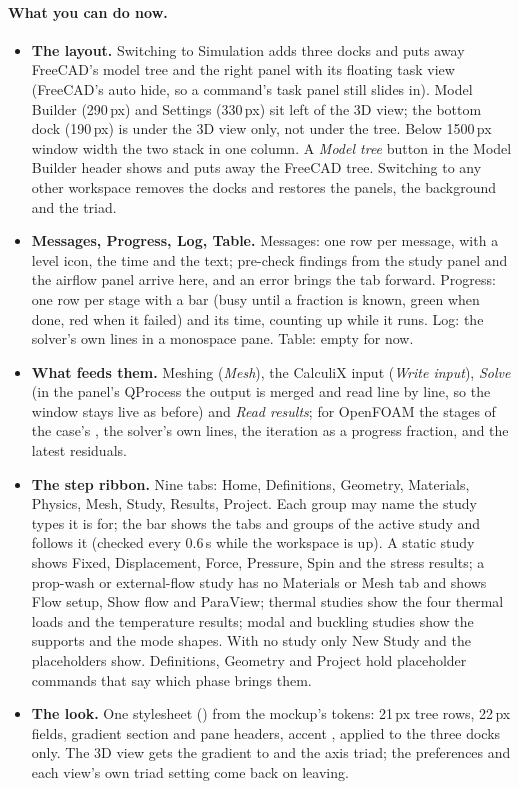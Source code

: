 \paragraph{What you can do now.}
\begin{itemize}[nosep]
  \item \textbf{The layout.} Switching to Simulation adds three docks and puts away FreeCAD's model tree and the right
        panel with its floating task view (FreeCAD's auto hide, so a command's task panel still slides in). Model
        Builder (290\,px) and Settings (330\,px) sit left of the 3D view; the bottom dock (190\,px) is under the 3D
        view only, not under the tree. Below 1500\,px window width the two stack in one column. A \emph{Model tree}
        button in the Model Builder header shows and puts away the FreeCAD tree. Switching to any other workspace
        removes the docks and restores the panels, the background and the triad.
  \item \textbf{Messages, Progress, Log, Table.} Messages: one row per message, with a level icon, the time and the
        text; pre-check findings from the study panel and the airflow panel arrive here, and an error brings the
        tab forward. Progress: one row per stage with a bar (busy until a fraction is known, green when done, red
        when it failed) and its time, counting up while it runs. Log: the solver's own lines in a monospace pane.
        Table: empty for now.
  \item \textbf{What feeds them.} Meshing (\emph{Mesh}), the CalculiX input (\emph{Write input}), \emph{Solve} (in
        the panel's QProcess the output is merged and read line by line, so the window stays live as before) and
        \emph{Read results}; for OpenFOAM the stages of the case's , the solver's own
         lines, the iteration as a progress fraction, and the latest residuals.
  \item \textbf{The step ribbon.} Nine tabs: Home, Definitions, Geometry, Materials, Physics, Mesh, Study, Results,
        Project. Each group may name the study types it is for; the bar shows the tabs and groups of the active
        study and follows it (checked every 0.6\,s while the workspace is up). A static study shows Fixed,
        Displacement, Force, Pressure, Spin and the stress results; a prop-wash or external-flow study has no Materials or Mesh
        tab and shows Flow setup, Show flow and ParaView; thermal studies show the four thermal loads and the
        temperature results; modal and buckling studies show the supports and the mode shapes. With no study only New
        Study and the placeholders show. Definitions, Geometry and Project hold placeholder commands that say which
        phase brings them.
  \item \textbf{The look.} One stylesheet () from the mockup's tokens: 21\,px tree rows, 22\,px
        fields, gradient section and pane headers, accent , applied to the three docks only. The 3D
        view gets the gradient  to  and the axis triad; the preferences and each view's
        own triad setting come back on leaving.
\end{itemize}

